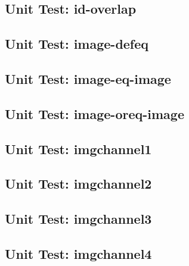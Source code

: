 \subsection*{Unit Test: id-overlap}

 \clearpage
\subsection*{Unit Test: image-defeq}

 \clearpage
\subsection*{Unit Test: image-eq-image}

 \clearpage
\subsection*{Unit Test: image-oreq-image}

 \clearpage
\subsection*{Unit Test: imgchannel1}

 \clearpage
\subsection*{Unit Test: imgchannel2}

 \clearpage
\subsection*{Unit Test: imgchannel3}

 \clearpage
\subsection*{Unit Test: imgchannel4}

 \clearpage
